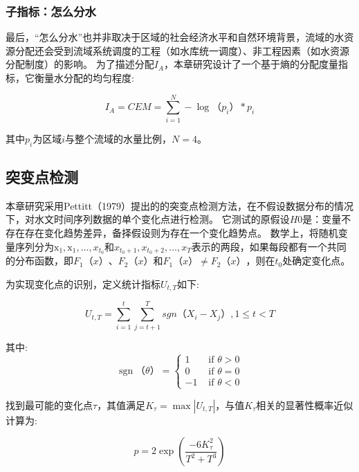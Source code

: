 \subsubsection{子指标：怎么分水}

最后，“怎么分水”也并非取决于区域的社会经济水平和自然环境背景，流域的水资源分配还会受到流域系统调度的工程（如水库统一调度）、非工程因素（如水资源分配制度）的影响\cite{schmandt2021,speed2013}。
为了描述分配$I_A$，本章研究设计了一个基于熵的分配度量指标，它衡量水分配的均匀程度:

\begin{equation}
    I_A = CEM = \sum_{i=1}^N - \log（p_{i}） * p_{i}
\end{equation}

其中$p_{i}$为区域$i$与整个流域的水量比例，$N=4$。

\subsection{突变点检测}

本章研究采用Pettitt（1979）提出的的突变点检测方法，在不假设数据分布的情况下，对水文时间序列数据的单个变化点进行检测\cite{pettitt1979}。
它测试的原假设$H0$是：变量不存在存在变化趋势差异，备择假设则为存在一个变化趋势点。
数学上，将随机变量序列分为$\mathrm{x}_{1}, \mathrm{x}_{1}, \ldots, x_{t_{0}}$和$x_{t_{0}+1}, x_{t_{0}+2}, \ldots, x_{T}$表示的两段，如果每段都有一个共同的分布函数，即$F_1（x）$、$F_2（x）$和$F_1（x） \neq F_2（x）$，则在$t_0$处确定变化点。

为实现变化点的识别，定义统计指标$U_{t,T}$如下:

\begin{equation}
    U_{t, T} = \sum_{i=1}^t\sum_{j=t+1}^T sgn（X_i - X_j）, 1 \leq t < T
\end{equation}

其中:
\begin{equation}
    \operatorname{sgn}（\theta）= \begin{cases}1 & \text { if } \theta>0 \\ 0 & \text { if } \theta=0 \\ -1 & \text { if } \theta<0\end{cases}
\end{equation}

找到最可能的变化点$\tau$，其值满足$K_{\tau} = \max|U_{t, T}|$，与值$K_{\tau}$相关的显著性概率近似计算为:

\begin{equation}
    p=2 \exp \left(\frac{-6 K_{\tau}^{2}}{T^{2}+T^{3}}\right)
\end{equation}

